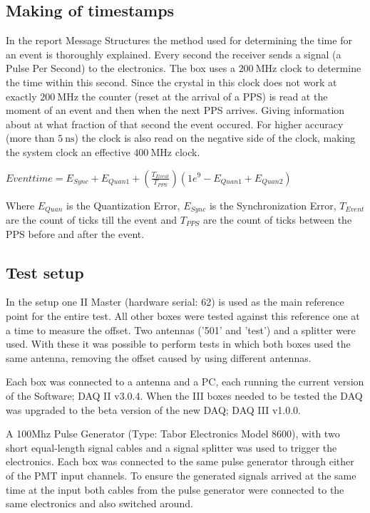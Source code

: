 \subsection{Making of timestamps}
\label{sub:gps_timestamps}

In the report Message Structures \hisparc the method used for
determining the time for an event is thoroughly explained. Every second
the \gps receiver sends a signal (a Pulse Per Second) to the \hisparc
electronics. The \hisparc box uses a $\SI{200}{\mega\hertz}$ clock to
determine the time within this second. Since the crystal in this clock
does not work at exactly $\SI{200}{\mega\hertz}$ the counter (reset at
the arrival of a PPS) is read at the moment of an event and then when
the next PPS arrives. Giving information about at what fraction of that
second the event occured. For higher accuracy (more than
$\SI{5}{\nano\second}$) the clock is also read on the negative side of
the clock, making the system clock an effective
$\SI{400}{\mega\hertz}$ clock.

$Event time = E_{Sync} + E_{Quan1} + (\frac{T_{Event}}{T_{PPS}}) (1e^9 -
E_{Quan1} + E_{Quan2})$

Where $E_{Quan}$ is the Quantization Error, $E_{Sync}$ is the
Synchronization Error, $T_{Event}$ are the count of ticks till the event
and $T_{PPS}$ are the count of ticks between the PPS before and after
the event.


\subsection{Test setup}
\label{sub:gps_test_setup}

In the setup one \hisparc II Master (hardware serial: 62) is used as the
main reference point for the entire test. All other \hisparc boxes were
tested against this reference one at a time to measure the offset. Two
\gps antennas ('501' and 'test') and a \gps splitter were used. With
these it was possible to perform tests in which both \hisparc boxes used
the same \gps antenna, removing the offset caused by using different
\gps antennas.

Each \hisparc box was connected to a \gps antenna and a PC, each running
the current version of the \hisparc Software; \hisparc DAQ II v3.0.4.
When the \hisparc III boxes needed to be tested the DAQ was upgraded to
the beta version of the new DAQ; \hisparc DAQ III v1.0.0.

A 100Mhz Pulse Generator (Type: Tabor Electronics Model 8600), with two
short equal-length signal cables and a signal splitter was used to
trigger the \hisparc electronics. Each box was connected to the same
pulse generator through either of the PMT input channels. To ensure the
generated signals arrived at the same time at the input both cables from
the pulse generator were connected to the same \hisparc electronics and
also switched around.

